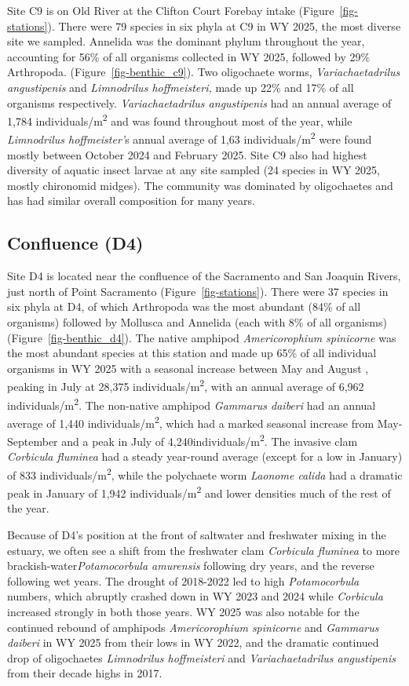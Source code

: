 \documentclass[
  letterpaper,
]{article}
\begin{document}
Site C9 is on Old River at the Clifton Court Forebay intake
(Figure~\ref{fig-stations}). There were 79 species in six phyla at C9 in
WY 2025, the most diverse site we sampled. Annelida was the dominant
phylum throughout the year, accounting for 56\% of all organisms
collected in WY 2025, followed by 29\% Arthropoda.
(Figure~\ref{fig-benthic_c9}). Two oligochaete worms,
\emph{Variachaetadrilus angustipenis} and \emph{Limnodrilus
hoffmeisteri,} made up 22\% and 17\% of all organisms respectively.
\emph{Variachaetadrilus angustipenis} had an annual average of 1,784
individuals/m\textsuperscript{2} and was found throughout most of the
year, while \emph{Limnodrilus hoffmeister'}s annual average of 1,63
individuals/m\textsuperscript{2} were found mostly between October 2024
and February 2025. Site C9 also had highest diversity of aquatic insect
larvae at any site sampled (24 species in WY 2025, mostly chironomid
midges). The community was dominated by oligochaetes and has had similar
overall composition for many years.

\subsection{Confluence (D4)}\label{confluence-d4}

Site D4 is located near the confluence of the Sacramento and San Joaquin
Rivers, just north of Point Sacramento (Figure~\ref{fig-stations}).
There were 37 species in six phyla at D4, of which Arthropoda was the
most abundant (84\% of all organisms) followed by Mollusca and Annelida
(each with 8\% of all organisms) (Figure~\ref{fig-benthic_d4}). The
native amphipod \emph{Americorophium spinicorne} was the most abundant
species at this station and made up 65\% of all individual organisms in
WY 2025 with a seasonal increase between May and August , peaking in
July at 28,375 individuals/m\textsuperscript{2}, with an annual average
of 6,962 individuals/m\textsuperscript{2}. The non-native amphipod
\emph{Gammarus daiberi} had an annual average of 1,440
individuals/m\textsuperscript{2}, which had a marked seasonal increase
from May-September and a peak in July of
4,240individuals/m\textsuperscript{2}. The invasive clam \emph{Corbicula
fluminea} had a steady year-round average (except for a low in January)
of 833 individuals/m\textsuperscript{2}, while the polychaete worm
\emph{Laonome calida} had a dramatic peak in January of 1,942
individuals/m\textsuperscript{2} and lower densities much of the rest of
the year.

Because of D4's position at the front of saltwater and freshwater mixing
in the estuary, we often see a shift from the freshwater clam
\emph{Corbicula fluminea} to more brackish-water\emph{Potamocorbula
amurensis} following dry years, and the reverse following wet years. The
drought of 2018-2022 led to high \emph{Potamocorbula} numbers, which
abruptly crashed down in WY 2023 and 2024 while \emph{Corbicula}
increased strongly in both those years. WY 2025 was also notable for the
continued rebound of amphipods \emph{Americorophium spinicorne} and
\emph{Gammarus daiberi} in WY 2025 from their lows in WY 2022, and the
dramatic continued drop of oligochaetes \emph{Limnodrilus hoffmeisteri}
and \emph{Variachaetadrilus angustipenis} from their decade highs in
2017.
\end{document}
